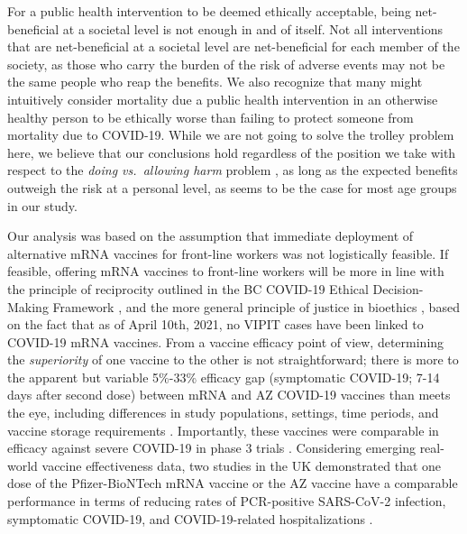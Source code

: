 \documentclass[]{interact}
\theoremstyle{plain}%
\theoremstyle{definition}
\theoremstyle{remark}
\begin{document}
For a public health intervention to be deemed ethically acceptable,
being net-beneficial at a societal level is not enough in and of itself.
Not all interventions that are net-beneficial at a societal level are
net-beneficial for each member of the society, as those who carry the
burden of the risk of adverse events may not be the same people who reap
the benefits. We also recognize that many might intuitively consider
mortality due a public health intervention in an otherwise healthy
person to be ethically worse than failing to protect someone from
mortality due to COVID-19. While we are not going to solve the trolley
problem here, we believe that our conclusions hold regardless of the
position we take with respect to the \emph{doing vs.~allowing harm}
problem \citep{woollard_doing_2016}, as long as the expected benefits
outweigh the risk at a personal level, as seems to be the case for most
age groups in our study.

Our analysis was based on the assumption that immediate deployment of
alternative mRNA vaccines for front-line workers was not logistically
feasible. If feasible, offering mRNA vaccines to front-line workers will
be more in line with the principle of reciprocity outlined in the BC
COVID-19 Ethical Decision-Making Framework \citep{bccdc_covid-19_2020},
and the more general principle of justice in bioethics
\citep{mccormick_principles_2021}, based on the fact that as of April
10th, 2021, no VIPIT cases have been linked to COVID-19 mRNA vaccines.
From a vaccine efficacy point of view, determining the
\emph{superiority} of one vaccine to the other is not straightforward;
there is more to the apparent but variable 5\%-33\% efficacy gap
(symptomatic COVID-19; 7-14 days after second dose) between mRNA and AZ
COVID-19 vaccines
\citep{polack_safety_2020, baden_efficacy_2021, astrazeneca_azd1222_2021, emary_efficacy_2021}
than meets the eye, including differences in study populations,
settings, time periods, and vaccine storage requirements
\citep{ledford_why_2021}. Importantly, these vaccines were comparable in
efficacy against severe COVID-19 in phase 3 trials
\citep{abdool_karim_new_2021, astrazeneca_azd1222_2021}. Considering
emerging real-world vaccine effectiveness data, two studies in the UK
demonstrated that one dose of the Pfizer-BioNTech mRNA vaccine or the AZ
vaccine have a comparable performance in terms of reducing rates of
PCR-positive SARS-CoV-2 infection, symptomatic COVID-19, and
COVID-19-related hospitalizations
\citep{shrotri_vaccine_2021, jamie_lopez_bernal_early_2021}.
\end{document}
